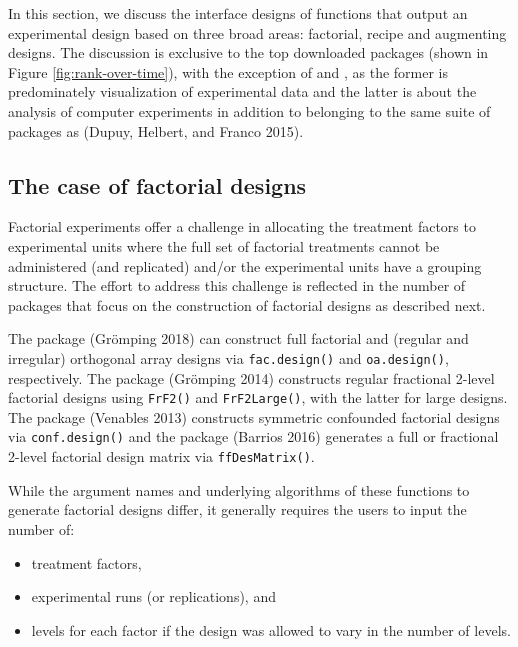 In this section, we discuss the interface designs of functions that output an experimental design based on three broad areas: factorial, recipe and augmenting designs. The discussion is exclusive to the top downloaded packages (shown in Figure \ref{fig:rank-over-time}), with the exception of  and , as the former is predominately visualization of experimental data and the latter is about the analysis of computer experiments in addition to belonging to the same suite of packages as  (Dupuy, Helbert, and Franco 2015).

\hypertarget{the-case-of-factorial-designs}{%
\subsection{The case of factorial designs}\label{the-case-of-factorial-designs}}

Factorial experiments offer a challenge in allocating the treatment factors to experimental units where the full set of factorial treatments cannot be administered (and replicated) and/or the experimental units have a grouping structure. The effort to address this challenge is reflected in the number of packages that focus on the construction of factorial designs as described next.

The  package (Grömping 2018) can construct full factorial and (regular and irregular) orthogonal array designs via \texttt{fac.design()} and \texttt{oa.design()}, respectively. The  package (Grömping 2014) constructs regular fractional 2-level factorial designs using \texttt{FrF2()} and \texttt{FrF2Large()}, with the latter for large designs. The  package (Venables 2013) constructs symmetric confounded factorial designs via \texttt{conf.design()} and the  package (Barrios 2016) generates a full or fractional 2-level factorial design matrix via \texttt{ffDesMatrix()}.

While the argument names and underlying algorithms of these functions to generate factorial designs differ, it generally requires the users to input the number of:

\begin{itemize}
\tightlist
\item
  treatment factors,
\item
  experimental runs (or replications), and
\item
  levels for each factor if the design was allowed to vary in the number of levels.
\end{itemize}

